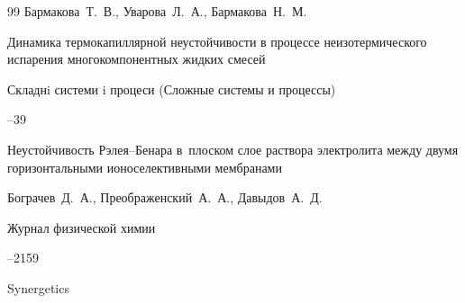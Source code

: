 \begin{thebibliography}{99}
\by Бармакова~Т.~В., Уварова~Л.~А., Бармакова~Н.~М. 

\paper Динамика термокапиллярной неустойчивости в процессе неизотермического испарения многокомпонентных жидких смесей 

\jour Складнi системи i процеси (Сложные системы и процессы)



--39












\paper Неустойчивость Рэлея--Бенара в~плоском слое раствора электролита между двумя горизонтальными ионоселективными мембранами

\by Бограчев~Д.~А., Преображенский~А.~А., Давыдов~А.~Д.

\jour Журнал физической химии




--2159



%


%








\book Synergetics



\end{thebibliography}
